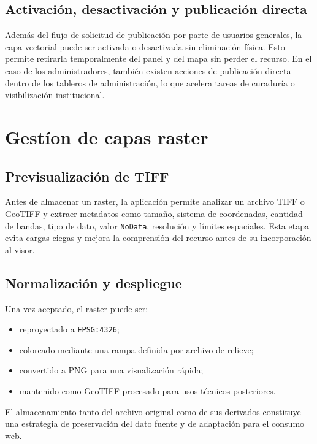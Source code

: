 \documentclass[12pt,a4paper]{report}
\begin{document}
\subsection{Activaci\'on, desactivaci\'on y publicaci\'on directa}

Adem\'as del flujo de solicitud de publicaci\'on por parte de usuarios generales, la capa vectorial puede ser activada o desactivada sin eliminaci\'on f\'isica. Esto permite retirarla temporalmente del panel y del mapa sin perder el recurso. En el caso de los administradores, tambi\'en existen acciones de publicaci\'on directa dentro de los tableros de administraci\'on, lo que acelera tareas de curadur\'ia o visibilizaci\'on institucional.

\section{Gest\'ion de capas raster}

\subsection{Previsualizaci\'on de TIFF}

Antes de almacenar un raster, la aplicaci\'on permite analizar un archivo TIFF o GeoTIFF y extraer metadatos como tama\~no, sistema de coordenadas, cantidad de bandas, tipo de dato, valor \texttt{NoData}, resoluci\'on y l\'imites espaciales. Esta etapa evita cargas ciegas y mejora la comprensi\'on del recurso antes de su incorporaci\'on al visor.

\subsection{Normalizaci\'on y despliegue}

Una vez aceptado, el raster puede ser:

\begin{itemize}
    \item reproyectado a \texttt{EPSG:4326};
    \item coloreado mediante una rampa definida por archivo de relieve;
    \item convertido a PNG para una visualizaci\'on r\'apida;
    \item mantenido como GeoTIFF procesado para usos t\'ecnicos posteriores.
\end{itemize}

El almacenamiento tanto del archivo original como de sus derivados constituye una estrategia de preservaci\'on del dato fuente y de adaptaci\'on para el consumo web.
\end{document}
